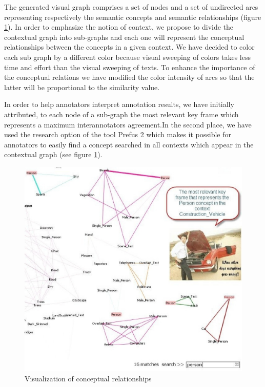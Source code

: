 The generated visual graph comprises a set of nodes and
a set of undirected arcs representing respectively the semantic concepts and semantic relationships (figure \ref{fig4444}). In order
to emphasize the notion of context, we propose to divide
the contextual graph into sub-graphs and each one will represent the conceptual relationships between the concepts in
a given context. We have decided to color each sub graph
by a different color because visual sweeping of colors takes
less time and effort than the visual sweeping of texts. To
enhance the importance of the conceptual relations we have
modified the color intensity of arcs so that the latter will be
proportional to the similarity value.

In order to help annotators interpret annotation results,
we have initially attributed, to each node of a sub-graph the
most relevant key frame which represents a maximum interannotators agreement.In the second place, we have used the
research option of the tool Prefus 2 which makes it possible
for annotators to easily find a concept searched in all contexts which appear in the contextual graph (see figure \ref{fig4444}).


		\begin{figure}[ht!!]	
			\centering
			\includegraphics[scale=0.3]{graphics/vis}
			\caption{Visualization of conceptual relationships}
			\label{fig4444}
		\end{figure}


